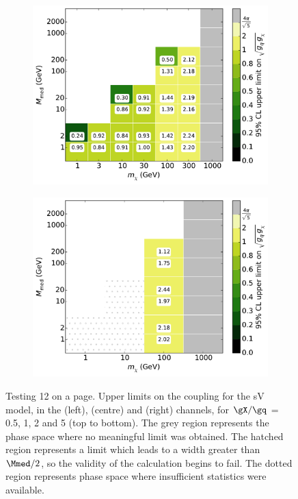 \begin{figure}[h]
\begin{subfigure}[t]{0.325\textwidth}
      \includegraphics[width=1.\textwidth]{figures/grid_allpoints_SVD_rat5.pdf}
      \caption{}
    \end{subfigure}
    \begin{subfigure}[t]{0.325\textwidth}
      \centering
      \includegraphics[width=1.\textwidth]{figures/grid_basepoints_SVD_rat5_monoWZ.pdf}
      \caption{}
    \end{subfigure}
    \caption{Testing 12 on a page. Upper limits on the coupling for the sV model, in the \monojet (left), \monoZ (centre) and \monoWZ (right) channels, for $\gX / \gq$ = 0.5, 1, 2 and 5 (top to bottom). The grey region represents the phase space where no meaningful limit was obtained. The hatched region represents a limit which leads to a width greater than $\Mmed / 2$, so the validity of the calculation begins to fail. The dotted region represents phase space where insufficient statistics were available.}
\end{figure}

